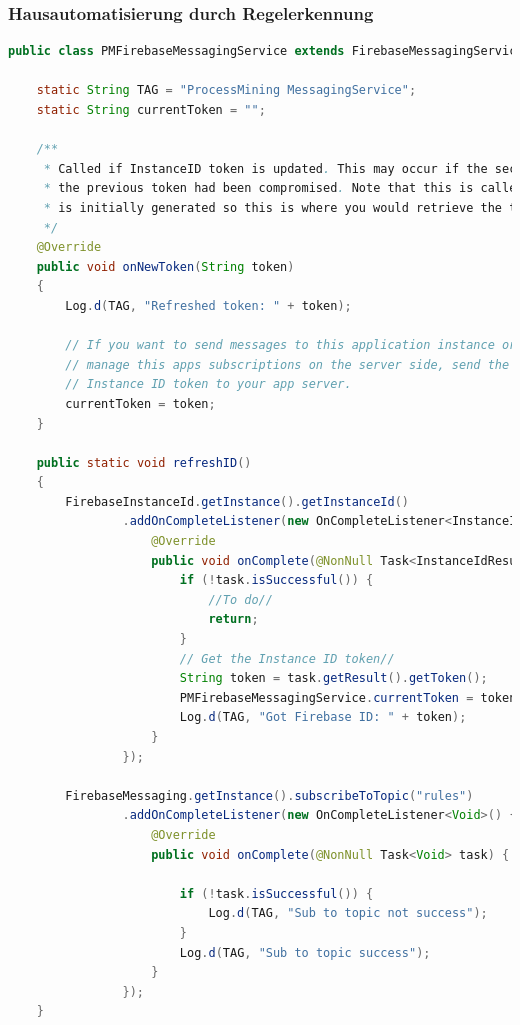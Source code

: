 \subsubsection{Hausautomatisierung durch Regelerkennung}\small
\begin{lstlisting}[language=Java]
public class PMFirebaseMessagingService extends FirebaseMessagingService {

    static String TAG = "ProcessMining MessagingService";
    static String currentToken = "";

    /**
     * Called if InstanceID token is updated. This may occur if the security of
     * the previous token had been compromised. Note that this is called when the InstanceID token
     * is initially generated so this is where you would retrieve the token.
     */
    @Override
    public void onNewToken(String token)
    {
        Log.d(TAG, "Refreshed token: " + token);

        // If you want to send messages to this application instance or
        // manage this apps subscriptions on the server side, send the
        // Instance ID token to your app server.
        currentToken = token;
    }

    public static void refreshID()
    {
        FirebaseInstanceId.getInstance().getInstanceId()
                .addOnCompleteListener(new OnCompleteListener<InstanceIdResult>() {
                    @Override
                    public void onComplete(@NonNull Task<InstanceIdResult> task) {
                        if (!task.isSuccessful()) {
                            //To do//
                            return;
                        }
                        // Get the Instance ID token//
                        String token = task.getResult().getToken();
                        PMFirebaseMessagingService.currentToken = token;
                        Log.d(TAG, "Got Firebase ID: " + token);
                    }
                });

        FirebaseMessaging.getInstance().subscribeToTopic("rules")
                .addOnCompleteListener(new OnCompleteListener<Void>() {
                    @Override
                    public void onComplete(@NonNull Task<Void> task) {

                        if (!task.isSuccessful()) {
                            Log.d(TAG, "Sub to topic not success");
                        }
                        Log.d(TAG, "Sub to topic success");
                    }
                });
    }


\end{lstlisting}
